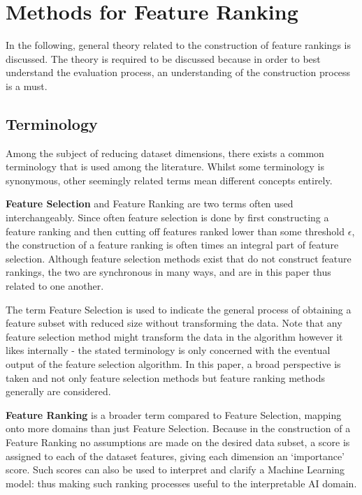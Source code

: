 \documentclass[../main.tex]{subfiles}
\begin{document}
\section{Methods for Feature Ranking}\label{section:methods}
In the following, general theory related to the construction of feature rankings is discussed. The theory is required to be discussed because in order to best understand the evaluation process, an understanding of the construction process is a must.



\subsection{Terminology}
Among the subject of reducing dataset dimensions, there exists a common terminology that is used among the literature. Whilst some terminology is synonymous, other seemingly related terms mean different concepts entirely.

\textbf{Feature Selection} and Feature Ranking are two terms often used interchangeably. Since often feature selection is done by first constructing a feature ranking and then cutting off features ranked lower than some threshold $\epsilon$, the construction of a feature ranking is often times an integral part of feature selection. Although feature selection methods exist that do not construct feature rankings, the two are synchronous in many ways, and are in this paper thus related to one another.

The term Feature Selection is used to indicate the general process of obtaining a feature subset with reduced size without transforming the data. Note that any feature selection method might transform the data in the algorithm however it likes internally - the stated terminology is only concerned with the eventual output of the feature selection algorithm. In this paper, a broad perspective is taken and not only feature selection methods but feature ranking methods generally are considered.

\textbf{Feature Ranking} is a broader term compared to Feature Selection, mapping onto more domains than just Feature Selection. Because in the construction of a Feature Ranking no assumptions are made on the desired data subset, a score is assigned to each of the dataset features, giving each dimension an `importance' score. Such scores can also be used to interpret and clarify a Machine Learning model: thus making such ranking processes useful to the interpretable AI domain.
\end{document}
